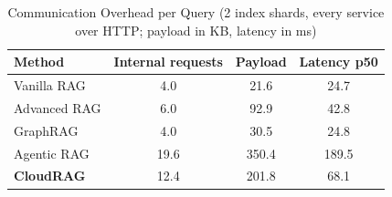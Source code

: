 \begin{table}[!htbp]
\centering
\caption{Communication Overhead per Query (2 index shards, every service over HTTP; payload in KB, latency in ms)}
\label{tab:communication}
\footnotesize
\begin{tabular*}{\columnwidth}{@{\extracolsep{\fill}}lccc@{}}
\toprule
Method & Internal requests & Payload & Latency p50 \\
\midrule
Vanilla RAG & 4.0 & 21.6 & 24.7 \\
Advanced RAG & 6.0 & 92.9 & 42.8 \\
GraphRAG & 4.0 & 30.5 & 24.8 \\
Agentic RAG & 19.6 & 350.4 & 189.5 \\
\textbf{CloudRAG} & 12.4 & 201.8 & 68.1 \\
\bottomrule
\end{tabular*}
\end{table}
